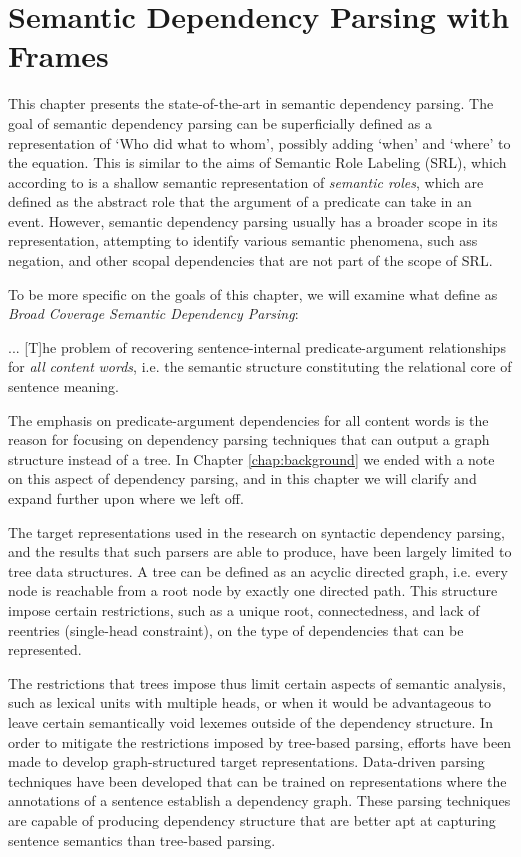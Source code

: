 \chapter{Semantic Dependency Parsing with Frames}
\label{chap:semantic}

This chapter presents the state-of-the-art in semantic dependency parsing. The goal of semantic dependency parsing can be superficially defined as a representation of `Who did what to whom', possibly adding `when' and `where' to the equation. This is similar to the aims of Semantic Role Labeling (SRL), which according to \cite{Jur:Mar:09} is a shallow semantic representation of \textit{semantic roles}, which are defined as the abstract role that the argument of a predicate can take in an event. However, semantic dependency parsing usually has a broader scope in its representation, attempting to identify various semantic phenomena, such ass negation, and other scopal dependencies that are not part of the scope of SRL.

To be more specific on the goals of this chapter, we will examine what  define as \textit{Broad Coverage Semantic Dependency Parsing}:

\begin{displayquote}
... [T]he problem of recovering sentence-internal predicate-argument relationships for \textit{all} \textit{content} \textit{words}, i.e. the semantic structure constituting the relational core of sentence meaning.
\end{displayquote}

The emphasis on predicate-argument dependencies for all content words is the reason for focusing on dependency parsing techniques that can output a graph structure instead of a tree. In Chapter \ref{chap:background} we ended with a note on this aspect of dependency parsing, and in this chapter we will clarify and expand further upon where we left off.

The target representations used in the research on syntactic dependency parsing, and the results that such parsers are able to produce, have been largely limited to tree data structures. A tree can be defined as an acyclic directed graph, i.e. every node is reachable from a root node by exactly one directed path. This structure impose certain restrictions, such as a unique root, connectedness, and lack of reentries (single-head constraint), on the type of dependencies that can be represented.

The restrictions that trees impose thus limit certain aspects of semantic analysis, such as lexical units with multiple heads, or when it would be advantageous to leave certain semantically void lexemes outside of the dependency structure. In order to mitigate the restrictions imposed by tree-based parsing, efforts have been made to develop graph-structured target representations. Data-driven parsing techniques have been developed that can be trained on representations where the annotations of a sentence establish a dependency graph. These parsing techniques are capable of producing dependency structure that are better apt at capturing sentence semantics than tree-based parsing.

